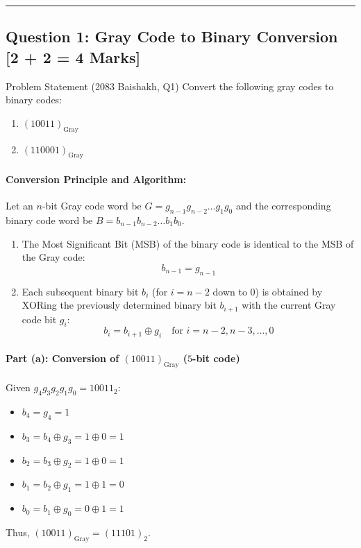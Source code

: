 \documentclass[11pt,a4paper,oneside]{book}
\begin{document}
\vspace{0.6cm}
\hrule
\vspace{0.6cm}

\subsection{Question 1: Gray Code to Binary Conversion [2 + 2 = 4 Marks]}
\begin{questionbox}{Problem Statement (2083 Baishakh, Q1)}
Convert the following gray codes to binary codes:
\begin{enumerate}[label=(\alph*)]
  \item $(10011)_{\text{Gray}}$
  \item $(110001)_{\text{Gray}}$
\end{enumerate}
\end{questionbox}

\paragraph{Conversion Principle and Algorithm:}
Let an $n$-bit Gray code word be $G = g_{n-1} g_{n-2} \dots g_1 g_0$ and the corresponding binary code word be $B = b_{n-1} b_{n-2} \dots b_1 b_0$.
\begin{enumerate}
  \item The Most Significant Bit (MSB) of the binary code is identical to the MSB of the Gray code:
  \[
  b_{n-1} = g_{n-1}
  \]
  \item Each subsequent binary bit $b_i$ (for $i = n-2$ down to $0$) is obtained by XORing the previously determined binary bit $b_{i+1}$ with the current Gray code bit $g_i$:
  \[
  b_i = b_{i+1} \oplus g_i \quad \text{for } i = n-2, n-3, \dots, 0
  \]
\end{enumerate}

\paragraph{Part (a): Conversion of $(10011)_{\text{Gray}}$ ($5$-bit code)}
Given $g_4 g_3 g_2 g_1 g_0 = 10011_2$:
\begin{itemize}
  \item $b_4 = g_4 = 1$
  \item $b_3 = b_4 \oplus g_3 = 1 \oplus 0 = 1$
  \item $b_2 = b_3 \oplus g_2 = 1 \oplus 0 = 1$
  \item $b_1 = b_2 \oplus g_1 = 1 \oplus 1 = 0$
  \item $b_0 = b_1 \oplus g_0 = 0 \oplus 1 = 1$
\end{itemize}
Thus, $(10011)_{\text{Gray}} = (11101)_2$.
\end{document}
